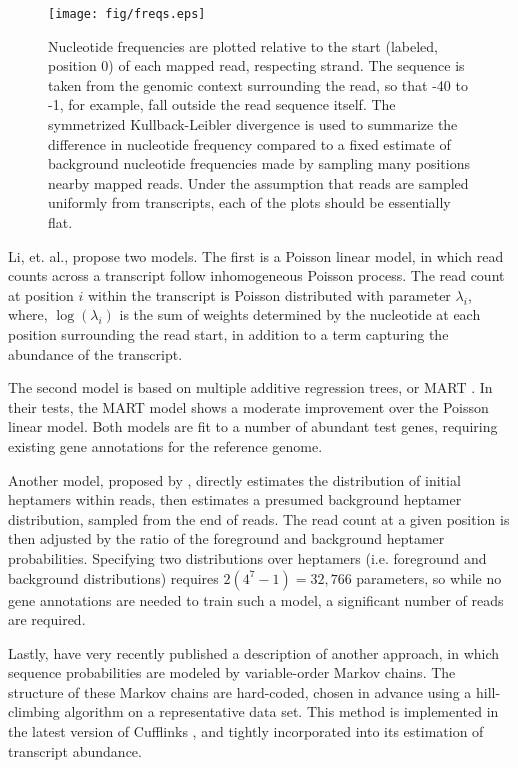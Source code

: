 \documentclass{bioinfo}
\begin{document}
\begin{figure*}
\centerline{\texttt{[image: fig/freqs.eps]}}
\caption{Nucleotide frequencies are plotted relative to the start (labeled,
position 0) of each mapped read, respecting strand. The sequence is taken from
the genomic context surrounding the read, so that -40 to -1, for example, fall
outside the read sequence itself. The symmetrized Kullback-Leibler divergence is
used to summarize the difference in nucleotide frequency compared to a fixed
estimate of background nucleotide frequencies made by sampling many positions
nearby mapped reads.  Under the assumption that reads are sampled uniformly from
transcripts, each of the plots should be essentially flat.}
\label{fig:freqs}
\end{figure*}

Li, et. al., \cite{Li2010} propose two models. The first is a Poisson linear
model, in which read counts across a transcript follow inhomogeneous Poisson
process. The read count at position $i$ within the transcript is Poisson
distributed with parameter $\lambda_i$, where, $\log(\lambda_i)$ is the sum of
weights determined by the nucleotide at each position surrounding the read
start, in addition to a term capturing the abundance of the transcript.

The second model is based on multiple additive regression trees, or MART
\citep{Friedman2003}.  In their tests, the MART model shows a moderate
improvement over the Poisson linear model. Both models are fit to a number of
abundant test genes, requiring existing gene annotations for the reference
genome. 

Another model, proposed by \citet{Hansen2010}, directly estimates the
distribution of initial heptamers within reads, then estimates a presumed
background heptamer distribution, sampled from the end of reads. The read count
at a given position is then adjusted by the ratio of the foreground and
background heptamer probabilities. Specifying two distributions over heptamers
(i.e. foreground and background distributions) requires $2(4^7-1) = 32,766$
parameters, so while no gene annotations are needed to train such a model, a
significant number of reads are required.

Lastly, \citet{Roberts2011} have very recently published a description of
another approach, in which sequence probabilities are modeled by variable-order
Markov chains. The structure of these Markov chains are hard-coded, chosen in
advance using a hill-climbing algorithm on a representative data set. This method
is implemented in the latest version of Cufflinks \citep{Trapnell2010}, and
tightly incorporated into its estimation of transcript abundance.
\end{document}

